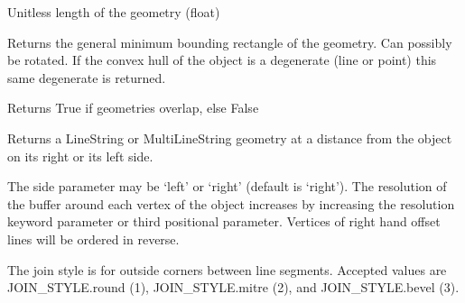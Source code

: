 \documentclass[letterpaper,10pt,english]{sphinxmanual}
\begin{document}
\begin{fulllineitems}

\begin{fulllineitems}
\label{\detokenize{reference:taipanPyRouter.ESegment.length}}
Unitless length of the geometry (float)

\end{fulllineitems}


\begin{fulllineitems}
\label{\detokenize{reference:taipanPyRouter.ESegment.minimum_rotated_rectangle}}
Returns the general minimum bounding rectangle of
the geometry. Can possibly be rotated. If the convex hull
of the object is a degenerate (line or point) this same degenerate
is returned.

\end{fulllineitems}


\begin{fulllineitems}
\label{\detokenize{reference:taipanPyRouter.ESegment.overlaps}}
Returns True if geometries overlap, else False

\end{fulllineitems}


\begin{fulllineitems}
\label{\detokenize{reference:taipanPyRouter.ESegment.parallel_offset}}
Returns a LineString or MultiLineString geometry at a distance from
the object on its right or its left side.

The side parameter may be ‘left’ or ‘right’ (default is ‘right’). The
resolution of the buffer around each vertex of the object increases by
increasing the resolution keyword parameter or third positional
parameter. Vertices of right hand offset lines will be ordered in
reverse.

The join style is for outside corners between line segments. Accepted
values are JOIN\_STYLE.round (1), JOIN\_STYLE.mitre (2), and
JOIN\_STYLE.bevel (3).


\end{fulllineitems}
\end{fulllineitems}
\end{document}
